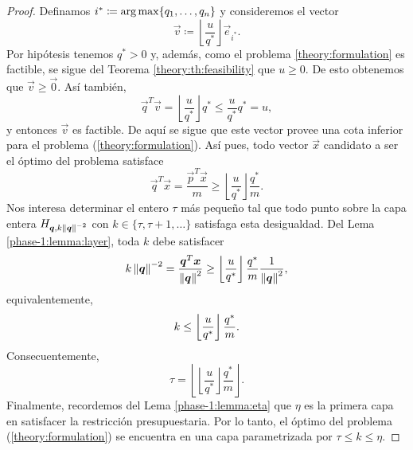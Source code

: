 \begin{proof}
	Definamos $i^* \coloneq \operatorname{arg\,max}\lbrace q_1, \ldots, q_n \rbrace$ y consideremos el vector
	\begin{equation*}
		\vec{v} \coloneq \left\lfloor \frac{u}{q^*} \right\rfloor \vec{e}_{i^*}.
	\end{equation*}
	Por hipótesis tenemos $q^* > 0$ y, además, como el problema
	\eqref{theory:formulation} es factible, se sigue del Teorema \ref{theory:th:feasibility} que $u
	\geq 0$. De esto obtenemos que $\vec{v} \geq \vec{0}$. Así también,
	\begin{equation*}
		\vec{q}^T\vec{v} = \left\lfloor \frac{u}{q^*} \right\rfloor q^*
		\leq \frac{u}{q^*}q^* = u,
	\end{equation*}
	y entonces $\vec{v}$ es factible. De aquí se sigue que este vector provee una cota inferior para
	el problema (\ref{theory:formulation}). Así pues, todo vector $\vec{x}$ candidato a ser el
	óptimo del problema satisface
	\begin{equation*}
		\vec{q}^T\vec{x} = \frac{\vec{p}^T\vec{x}}{m} \geq \left\lfloor \frac{u}{q^*}
		\right\rfloor \frac{q^*}{m}.
	\end{equation*}
	Nos interesa determinar el entero $\tau$ más pequeño tal que todo punto sobre la capa
	entera $H_{\boldsymbol{q}, k\left\lVert \boldsymbol{q} \right\rVert^{-2}}$ con $k \in \lbrace \tau, \tau + 1, \ldots \rbrace$
	satisfaga esta desigualdad. Del Lema \ref{phase-1:lemma:layer}, toda $k$ debe satisfacer
	\begin{equation*}
		k\left\lVert \boldsymbol{q} \right\rVert^{-2} = \frac{\boldsymbol{q}^T\boldsymbol{x}}{\left\lVert \boldsymbol{q} \right\rVert^2} \geq
		\left\lfloor \frac{u}{q^*} \right\rfloor \frac{q^*}{m}
		\frac{1}{\left\lVert \boldsymbol{q} \right\rVert^2},
	\end{equation*}
	equivalentemente,
	\begin{equation*}
		k \leq \left\lfloor \frac{u}{q^*} \right\rfloor\frac{q^*}{m}.
	\end{equation*}
	Consecuentemente,
	\begin{equation*}
		\tau =
		\left\lfloor \left\lfloor \frac{u}{q^*} \right\rfloor \frac{q^*}{m}
			\right\rfloor.
	\end{equation*}
	Finalmente, recordemos del Lema \ref{phase-1:lemma:eta} que $\eta$ es la primera capa en
	satisfacer la restricción presupuestaria. Por lo tanto, el óptimo del problema
	(\ref{theory:formulation}) se encuentra en una capa parametrizada por $\tau \leq k \leq \eta$.
\end{proof}

